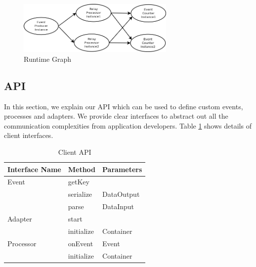 \begin{figure}[!t]
        \centering
        \includegraphics[width=3.0in]{runtimegraph.png}
        \caption{Runtime Graph}
        \label{runtimegraph}
\end{figure}

\subsection{API}
In this section, we explain our API which can be used to define custom events, processes and adapters. We provide clear interfaces to abstract out all the communication complexities from application developers. Table \ref{api} shows details of client interfaces.



\begin{table}[ht]
	\centering
	\begin{tabular}{| l | l | l |}
        \hline
        Interface Name &  Method & Parameters \\
        \hline
        Event   & getKey &  \\
        \cline{2-3}
        & serialize &  DataOutput \\
	\cline{2-3}        
        & parse &  DataInput \\
        \hline
        Adapter   & start &  \\
        \cline{2-3}
        & initialize &  Container \\
        \hline
        Processor   & onEvent & Event \\
        \cline{2-3}
        & initialize &  Container \\
        \hline
        \end{tabular}
        \caption{Client API}
        \label{api}
\end{table}


